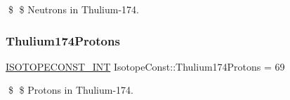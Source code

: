 \$ \$ Neutrons in Thulium-\/174. \mbox{\label{group___isotope_const-_thulium-_tm174_ga37a93dd29a0571c2e8e395f0ff843f3f}} 
\subsubsection{\texorpdfstring{Thulium174\+Protons}{Thulium174Protons}}
{\footnotesize\ttfamily \mbox{\hyperlink{group___isotope_const-_macros_ga5f18360b3e99483a35c32d789e62621c}{I\+S\+O\+T\+O\+P\+E\+C\+O\+N\+S\+T\+\_\+\+I\+NT}} Isotope\+Const\+::\+Thulium174\+Protons = 69}

\$ \$ Protons in Thulium-\/174. 